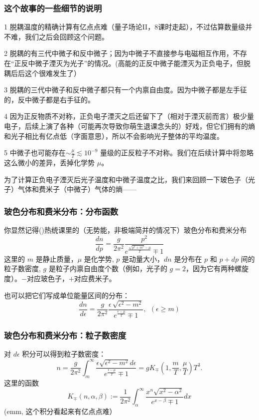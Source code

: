 \documentclass[CJK,13pt]{beamer}
\begin{document}
  \begin{frame}
    \frametitle{这个故事的一些细节的说明}


    \bitem
    \item[1]{脱耦温度的精确计算有亿点点难（量子场论II，8课时走起），不过估算数量级并不难，我们之后会回顾这个问题。}
    \item[2]{脱耦的有三代中微子和反中微子；因为中微子不直接参与电磁相互作用，不存在“正反中微子湮灭为光子”的情况。(高能的正反中微子能湮灭为正负电子，但脱耦后后这个很难发生了）}
    \item[3]{脱耦的三代中微子和反中微子都只有一个内禀自由度。因为中微子都是左手征的，反中微子都是右手征的。}      
    \item[4]{因为正反物质不对称，正负电子湮灭之后还留下了（相对于湮灭前而言）极少量电子，后续上演了各种（可能再次导致你萌生退课念头的）好戏，但它们拥有的熵和光子相比有亿点低（字面意思），所以不会影响光子整体的平均温度。}
      \item[5]{中微子也可能存在$\sim \frac{\mu}{T}\lesssim 10^{-9}$ 量级的正反粒子不对称。我们在后续计算中将忽略这么微小的差异，丢掉化学势 $\mu$。}
        \eitem

  \end{frame}

  \begin{frame}

    为了计算正负电子湮灭后光子温度和中微子温度之比，我们来回顾一下玻色子（光子）气体和费米子（中微子）气体的熵——

  \end{frame}
  

  \begin{frame}
    \frametitle{玻色分布和费米分布：分布函数}
    你显然记得()热统课里的（无势能，非极端简并的情况下）玻色分布和费米分布
    $$\frac{dn}{d p} = \frac{g}{2\pi^2}\frac{p^2}{e^{\frac{\sqrt{p^2+m^2}- \mu}{T}}\mp 1}$$
    这里的 $m$ 是静止质量，$\mu$ 是化学势, $p$ 是动量大小，$dn$ 是分布在 $p$ 和 $p+dp$ 间的粒子数密度, $g$ 是粒子内禀自由度个数（例如，光子的 $g=2$，因为它有两种螺旋度）。$-$对应玻色子，$+$对应费米子。


    也可以把它们写成单位能量区间的分布：
    $$\frac{dn}{d\epsilon} = \frac{g}{2\pi^2}\frac{\epsilon  \,\sqrt{\epsilon^2-m^2}}{e^{\frac{\epsilon- \mu}{T}}\mp 1} ,\ \ (\epsilon\ge m)$$


  \end{frame}


  \begin{frame}
    \frametitle{玻色分布和费米分布：粒子数密度}
    对 $d\epsilon$ 积分可以得到粒子数密度：
    $$ n = \frac{g}{2\pi^2}\int_m^\infty \frac{\epsilon\sqrt{\epsilon^2-m^2}d\epsilon}{e^{\frac{\epsilon- \mu}{T}}\mp 1}=   gK_{\mp}(1,\frac{m}{T},\frac{\mu}{T}) T^3.$$
    这里的函数
     $$K_{\mp}(n, \alpha, \beta) := \frac{1}{2\pi^2}\int_\alpha^\infty \frac{x^n\sqrt{x^2-\alpha^2}}{e^{x-\beta}\mp 1} dx $$
    (\question emm, 这个积分看起来有亿点点难）
  \end{frame}
\end{document}
